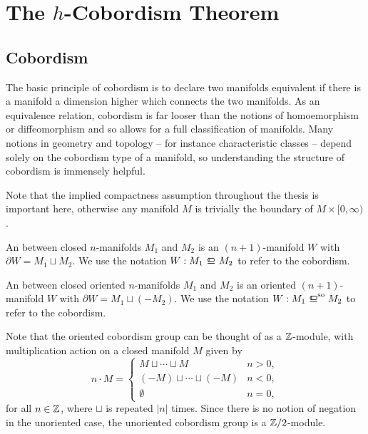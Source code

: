 \chapter{The \texorpdfstring{$h$}{h}-Cobordism Theorem}\label{chap:h-cobordism}


\section{Cobordism}\label{sec:cobordism}

The basic principle of cobordism is to declare two manifolds equivalent if there is a manifold a dimension higher which connects the two manifolds. As an equivalence relation, cobordism is far looser than the notions of homoemorphism or diffeomorphism and so allows for a full classification of manifolds. Many notions in geometry and topology -- for instance characteristic classes -- depend solely on the cobordism type of a manifold, so understanding the structure of cobordism is immensely helpful.

\begin{remark}
	Note that the implied compactness assumption throughout the thesis is important here, otherwise any manifold $M$ is trivially the boundary of $M\times [0,\infty)$.
\end{remark}

\begin{definition}
	An  between closed $n$-manifolds $M_1$ and $M_2$ is an $(n+1)$-manifold $W$ with $\partial W = M_1\sqcup M_2$. We use the notation $W : M_1\bord M_2$ to refer to the cobordism.
\end{definition}

\begin{definition}
	An  between closed oriented $n$-manifolds $M_1$ and $M_2$ is an oriented $(n+1)$-manifold $W$ with $\partial W = M_1\sqcup (-M_2)$. We use the notation $W : M_1\sobord M_2$ to refer to the cobordism.
\end{definition}

\begin{remark}
\end{remark}

Note that the oriented cobordism group can be thought of as a $\mathbb{Z}$-module, with multiplication action on a closed manifold $M$ given by
\[
	n \cdot M = \begin{cases} M\sqcup \cdots \sqcup M & n > 0,\\ (-M)\sqcup \cdots \sqcup (-M) & n < 0,\\ \emptyset & n=0,\end{cases}
\]
for all $n\in \mathbb{Z}$, where $\sqcup$ is repeated $|n|$ times. Since there is no notion of negation in the unoriented case, the unoriented cobordism group is a $\mathbb{Z}/2$-module.

